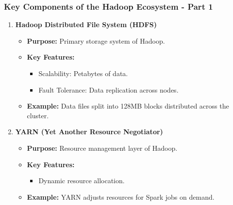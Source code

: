 \documentclass[aspectratio=169]{beamer}
\begin{document}
\begin{frame}[fragile]
    \frametitle{Key Components of the Hadoop Ecosystem - Part 1}
    \begin{enumerate}
        \item \textbf{Hadoop Distributed File System (HDFS)}
        \begin{itemize}
            \item \textbf{Purpose:} Primary storage system of Hadoop.
            \item \textbf{Key Features:}
            \begin{itemize}
                \item Scalability: Petabytes of data.
                \item Fault Tolerance: Data replication across nodes.
            \end{itemize}
            \item \textbf{Example:} Data files split into 128MB blocks distributed across the cluster.
        \end{itemize}

        \item \textbf{YARN (Yet Another Resource Negotiator)}
        \begin{itemize}
            \item \textbf{Purpose:} Resource management layer of Hadoop.
            \item \textbf{Key Features:} 
            \begin{itemize}
                \item Dynamic resource allocation.
            \end{itemize}
            \item \textbf{Example:} YARN adjusts resources for Spark jobs on demand.
        \end{itemize}
    \end{enumerate}
\end{frame}
\end{document}
